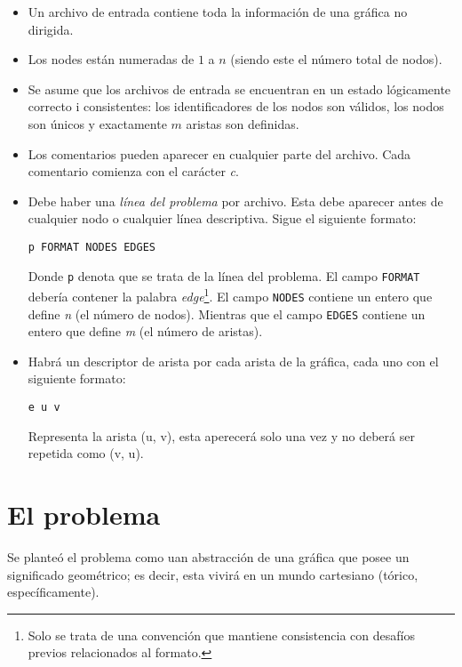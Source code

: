\documentclass[a4paper]{report}
\begin{document}
\begin{itemize}
\item Un archivo de entrada contiene toda la informaci\'on de una gr\'afica no
  dirigida.
\item Los nodes est\'an numeradas de $1$ a $n$ (siendo este el n\'umero total
  de nodos).
\item Se asume que los archivos de entrada se encuentran en un estado l\'ogicamente
  correcto i consistentes: los identificadores de los nodos son v\'alidos, los nodos
  son \'unicos y exactamente $m$ aristas son definidas.
\item Los comentarios pueden aparecer en cualquier parte del archivo. Cada comentario
  comienza con el car\'acter \textit{c}.
\item Debe haber una \textit{l\'inea del problema} por archivo. Esta debe aparecer
  antes de cualquier nodo o cualquier l\'inea descriptiva. Sigue el siguiente formato:

  \begin{center}
    \texttt{p FORMAT NODES EDGES}
  \end{center}

  Donde \texttt{p} denota que se trata de la l\'inea del problema. El campo \texttt{FORMAT}
  deber\'ia contener la palabra \textit{edge}\footnote{Solo se trata de una convenci\'on
    que mantiene consistencia con desaf\'ios previos relacionados al formato.}. El campo
  \texttt{NODES} contiene un entero que define \textit{n} (el n\'umero de nodos). Mientras
  que el campo \texttt{EDGES} contiene un entero que define \textit{m} (el n\'umero de aristas).

\item Habr\'a un descriptor de arista por cada arista de la gr\'afica, cada uno con el siguiente
  formato:

  \begin{center}
    \texttt{e u v}
  \end{center}
  Representa la arista (u, v), esta aperecer\'a solo una vez y no deber\'a ser repetida como
  (v, u).
\end{itemize}

\section{El problema}

Se plante\'o el problema como uan abstracci\'on de una gr\'afica que posee un significado geom\'etrico;
es decir, esta vivir\'a en un mundo cartesiano (t\'orico, espec\'ificamente).
\end{document}
